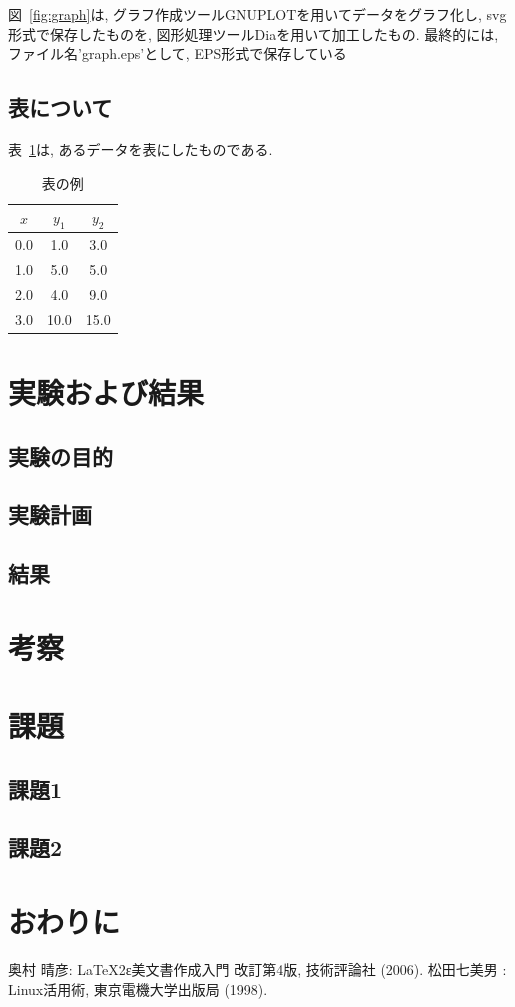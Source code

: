 \documentclass{jarticle}
\begin{document}
図~\ref{fig:graph}は, グラフ作成ツールGNUPLOTを用いてデータをグラフ化し, 
svg形式で保存したものを, 図形処理ツールDiaを用いて加工したもの. 
最終的には, ファイル名'graph.eps'として, EPS形式で保存している

\subsection{表について}
%
表~\ref{table:table1}は, あるデータを表にしたものである. 

\begin{table}
\caption{表の例}
\label{table:table1}
\begin{center}
\begin{tabular}{|c|c|c|}\hline
$x$ & $y_{1}$ & $y_{2}$ \\ \hline
0.0 & 1.0 & 3.0 \\ \hline
1.0 & 5.0 & 5.0 \\ \hline
2.0 & 4.0 & 9.0 \\ \hline
3.0 & 10.0 & 15.0 \\\hline
\end{tabular}
\end{center}
\end{table}

\section{実験および結果}
%
\subsection{実験の目的}
%
\subsection{実験計画}
%
\subsection{結果}
%
\section{考察}
%
\section{課題}
%
\subsection{課題1}
%
\subsection{課題2}
%
\section{おわりに} 
%
\begin{thebibliography}{99}
%
 奥村 晴彦: LaTeX2ε美文書作成入門 改訂第4版,  技術評論社 (2006).
%
 松田七美男 : Linux活用術, 東京電機大学出版局 (1998).
%
\end{thebibliography}
\end{document}
